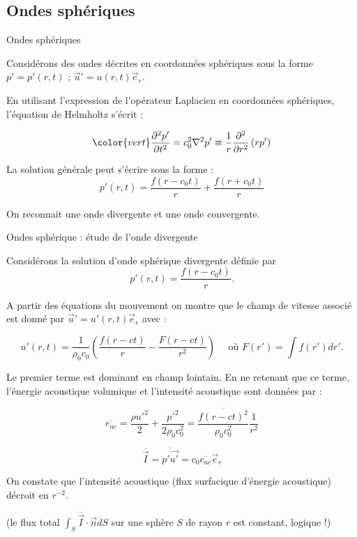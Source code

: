 \subsection{Ondes sphériques}
\begin{frame}{Ondes sphériques}

Considérons des ondes décrites en coordonnées sphériques sous la forme $p' = p'(r,t)$ ; 
$\vec{u}'  = u(r,t) \vec{e}_r$.

En utilisant l'expression de l'opérateur Laplacien en coordonnées sphériques, l'équation de Helmholtz s'écrit :

\begin{equation}
	\color{vert}
	\ddpdt{p'} = c_0^2 \nabla^2 p' \equiv \frac{1}{r} \frac{\partial^2}{\partial r^2}\left(r p'\right)
\end{equation}

La solution générale peut s'écrire sous la forme :
$$
p'(r,t) = \frac{f(r-c_0 t)}{r} +  \frac{f(r+c_0t)}{r} 
$$

On reconnait une onde divergente et une onde convergente.


\end{frame}

\begin{frame}{Ondes sphérique : étude de l'onde divergente}
\small

Considérons la solution d'onde sphérique divergente définie par 
$$
p'(r,t) = \frac{f(r-c_0 t)}{r}.
$$

A partir des équations du mouvement on montre que le champ de vitesse associé est donné par $\vec{u}'  = u'(r,t) \vec{e}_r$ avec :

$$
u'(r,t) = \frac{1}{\rho_0 c_0} \left( \frac{f(r-ct)}{r} - \frac{F(r-ct)}{r^2} \right) \quad \mbox{ où } F(r') = \int f(r') d r'.   
$$

Le premier terme est dominant en champ lointain. En ne retenant que ce terme, l'énergie acoustique volumique et l'intensité acoustique sont données par :

$$
\overline{e_{ac}} = \frac{\rho u'^2}{2} + \frac{p'^2}{2 \rho_0 c_0^2} = 
\frac{\overline{f(r-ct)^2}}{\rho_0 c_0^2}
\frac{1}{r^2} 
$$

$$
\overline{\vec{I}} = \overline{p' \vec {u'} } = c_0 \overline{e_{ac}} \vec{e}_r
$$

On constate que l'intensité acoustique (flux surfacique d'énergie acoustique) décroit en $r^{-2}$.

(le flux total $ \int_S \overline{\vec{I}} \cdot \vec{n}  dS$ 
sur une sphère $S$ de rayon $r$ est constant, logique !)




\end{frame}


